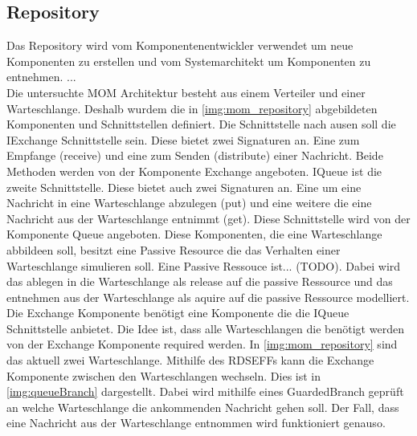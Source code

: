 \subsection{Repository}
Das Repository wird vom Komponentenentwickler verwendet um neue Komponenten zu erstellen und vom Systemarchitekt um Komponenten zu entnehmen. ... \\
Die untersuchte MOM Architektur besteht aus einem Verteiler und einer Warteschlange. Deshalb wurdem die in \autoref{img:mom_repository} abgebildeten Komponenten und Schnittstellen definiert. Die Schnittstelle nach ausen soll die IExchange Schnittstelle sein. Diese bietet zwei Signaturen an. Eine zum Empfange (receive) und eine zum Senden (distribute) einer Nachricht. Beide Methoden werden von der Komponente Exchange angeboten. IQueue ist die zweite Schnittstelle. Diese bietet auch zwei Signaturen an. Eine um eine Nachricht in eine Warteschlange abzulegen (put) und eine weitere die eine Nachricht aus der Warteschlange entnimmt (get). Diese Schnittstelle wird von der Komponente Queue angeboten. Diese Komponenten, die eine Warteschlange abbildeen soll, besitzt eine Passive Resource die das Verhalten einer Warteschlange simulieren soll. Eine Passive Ressouce ist... (TODO). Dabei wird das ablegen in die Warteschlange als release auf die passive Ressource und das entnehmen aus der Warteschlange als aquire auf die passive Ressource modelliert. Die Exchange Komponente benötigt eine Komponente die die IQueue Schnittstelle anbietet. Die Idee ist, dass alle Warteschlangen die benötigt werden von der Exchange Komponente required werden. In \autoref{img:mom_repository} sind das aktuell zwei Warteschlange. Mithilfe des RDSEFFs kann die Exchange Komponente zwischen den Warteschlangen wechseln. Dies ist in \autoref{img:queueBranch} dargestellt. Dabei wird mithilfe eines GuardedBranch geprüft an welche Warteschlange die ankommenden Nachricht gehen soll. Der Fall, dass eine Nachricht aus der Warteschlange entnommen wird funktioniert genauso. 




